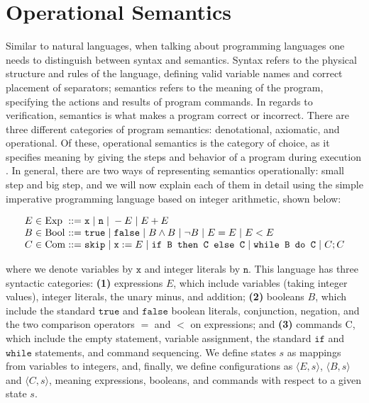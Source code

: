 \documentclass[a4paper,11pt,twoside]{report}
\begin{document}
\section{Operational Semantics}\label{sec:opsem}
Similar to natural languages, when talking about programming languages one needs to distinguish between syntax and semantics. Syntax refers to the physical structure and rules of the language, defining valid variable names and correct placement of separators; semantics refers to the meaning of the program, specifying the actions and results of program commands. In regards to verification, semantics is what makes a program correct or incorrect. There are three different categories of program semantics: denotational, axiomatic, and operational. Of these, operational semantics is the category of choice, as it specifies meaning by giving the steps and behavior of a program during execution \cite{PittsAM:opespe}. In general, there are two ways of representing semantics operationally: small step and big step, and we will now explain each of them in detail using the simple imperative programming language based on integer arithmetic, shown below:

$$
\arraycolsep=1.5pt
\begin{array}{rclcl}
E & \in & \mathrm{Exp} & ::= & \texttt{x} \myor \texttt{n} \myor - E \myor E + E \\
B & \in & \mathrm{Bool} & ::= & \texttt{true} \myor \texttt{false} \myor B \land B \myor \neg B \myor E = E \myor E < E \\
C & \in & \mathrm{Com} & ::= & \texttt{skip} \myor \texttt{x}:=E \myor \texttt{if B then C else C} \myor \texttt{while B do C} \myor C; C 
\end{array}
$$

\noindent where we denote variables by $\texttt{x}$ and integer literals by $\texttt{n}$. This language has three syntactic categories: {\bfseries(1)} expressions $E$, which include variables (taking integer values), integer literals, the unary minus, and addition; {\bfseries(2)} booleans $B$, which include the standard $\mathtt{true}$ and $\mathtt{false}$ boolean literals, conjunction, negation, and the two comparison operators $=$ and $<$ on expressions; and {\bfseries(3)} commands {C}, which include the empty statement, variable assignment, the standard $\mathtt{if}$ and $\mathtt{while}$ statements, and command sequencing. We define states $s$ as mappings from variables to integers, and, finally, we define configurations as $\langle E,s \rangle$, $\langle B,s\rangle$ and $\langle C,s \rangle$, meaning expressions, booleans, and commands with respect to a given state $s$.
\end{document}
